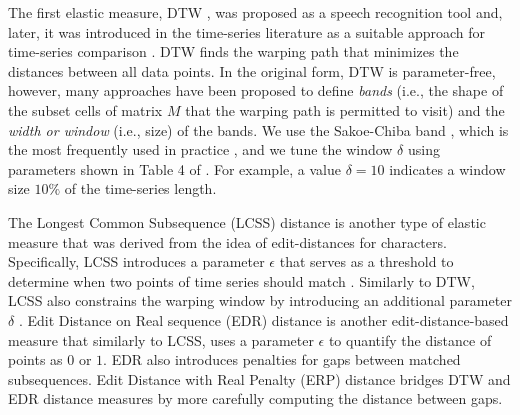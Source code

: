 \documentclass[11pt]{article}
\begin{document}
The first elastic measure, DTW \cite{sakoe1971dynamic,sakoe1978dynamic}, was proposed as a speech recognition tool and, later, it was introduced in the time-series literature as a suitable approach for time-series comparison \cite{berndt1994using}. DTW finds the warping path that minimizes the distances between all data points. In the original form, DTW is parameter-free, however, many approaches have been proposed to define {\em bands} (i.e., the shape of the subset cells of matrix $M$ that the warping path is permitted to visit) and the {\em width or window} (i.e., size) of the bands. We use the Sakoe-Chiba band \cite{sakoe1978dynamic}, which is the most frequently used in practice \cite{ding2008querying}, and we tune the window $\delta$ using parameters shown in Table 4 of \cite{paparrizos2020debunking}. For example, a value $\delta=10$ indicates a window size $10\%$ of the time-series length. 

The Longest Common Subsequence (LCSS) distance is another type of elastic measure that was derived from the idea of edit-distances for characters. Specifically, LCSS introduces a parameter $\epsilon$ that serves as a threshold to determine when two points of time series should match \cite{andre1997using,vlachos2002discovering}. Similarly to DTW, LCSS also constrains the warping window by introducing an additional parameter $\delta$ \cite{vlachos2002discovering}. Edit Distance on Real sequence (EDR) distance \cite{chen2005robust} is another edit-distance-based measure that similarly to LCSS, uses a parameter $\epsilon$ to quantify the distance of points as $0$ or $1$. EDR also introduces penalties for gaps between matched subsequences. Edit Distance with Real Penalty (ERP) distance \cite{chen2004marriage} bridges DTW and EDR distance measures by more carefully computing the distance between gaps.
\end{document}
